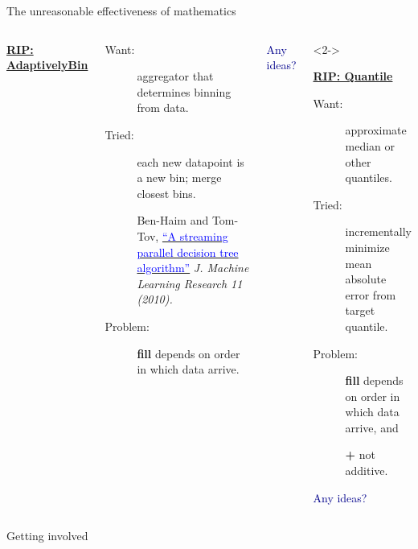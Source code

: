 \documentclass[aspectratio=169]{beamer}
\begin{document}
\begin{frame}{The unreasonable effectiveness of mathematics}
\large
\begin{columns}
\begin{center}
\bf \underline{RIP: AdaptivelyBin}
\end{center}

\begin{description}
\item[Want:] aggregator that determines binning from data.

\item[Tried:] each new datapoint is a new bin; merge closest bins.

\vspace{0.25 cm}
\begin{minipage}{\linewidth}
\scriptsize Ben-Haim and Tom-Tov, \href{http://www.jmlr.org/papers/volume11/ben-haim10a/ben-haim10a.pdf}{\textcolor{blue}{``A streaming parallel decision tree algorithm''}} {\it J. Machine Learning Research 11 (2010).}
\end{minipage}

\item[Problem:] {\ttfamily\small\textbf{fill}} depends on order in which data arrive.
\end{description}

\begin{center}
\textcolor{darkblue}{Any ideas?}
\end{center}

\begin{uncoverenv}<2->
\begin{center}
\bf \underline{RIP: Quantile}
\end{center}

\begin{description}
\item[Want:] approximate median or other quantiles.

\item[Tried:] incrementally minimize mean absolute error from target quantile.

\item[Problem:] {\ttfamily\small\textbf{fill}} depends on order in which data arrive, and

{\ttfamily\small\textbf{+}} not additive.
\end{description}

\begin{center}
\textcolor{darkblue}{Any ideas?}
\end{center}
\end{uncoverenv}
\end{columns}
\end{frame}

\begin{frame}{Getting involved}
\end{frame}
\end{document}
